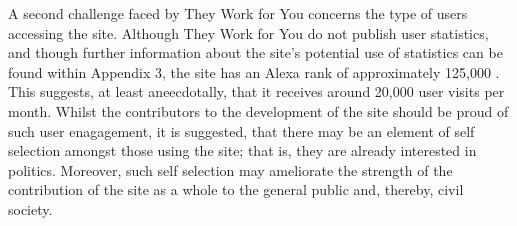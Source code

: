 A second challenge faced by They Work for You concerns the type of users accessing the site.
Although They Work for You do not publish user statistics, and though further information about the site's potential use of statistics can be found within Appendix 3, the site has an Alexa rank of approximately 125,000 \cite{alexa-rank}.
This suggests, at least aneecdotally, that it receives around 20,000 user visits per month.
Whilst the contributors to the development of the site should be proud of such user enagagement, it is suggested, that there may be an element of self selection amongst those using the site; that is, they are already interested in politics.
Moreover, such self selection may ameliorate the strength of the contribution of the site as a whole to the general public and, thereby, civil society.
